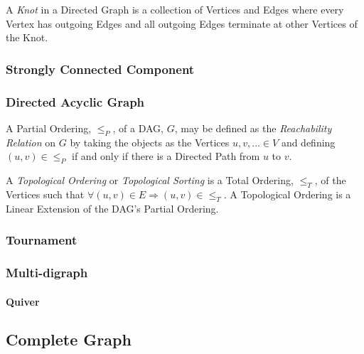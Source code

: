 A \emph{Knot} in a Directed Graph is a collection of Vertices and
Edges where every Vertex has outgoing Edges and all outgoing Edges
terminate at other Vertices of the Knot.



\subsubsection{Strongly Connected Component}
\label{sec:strongly_connected}

\subsubsection{Directed Acyclic Graph} \label{sec:dag}

A Partial Ordering, $\leq_P$, of a DAG, $G$, may be defined as the
\emph{Reachability Relation} on $G$ by taking the objects as the
Vertices $u,v,... \in V$ and defining $(u,v) \in \leq_P$ if and only
if there is a Directed Path from $u$ to $v$.

A \emph{Topological Ordering} or \emph{Topological Sorting} is a Total
Ordering, $\leq_T$, of the Vertices such that $\forall (u,v) \in E
\Rightarrow (u,v) \in \leq_T$. A Topological Ordering is a Linear
Extension of the DAG's Partial Ordering. %



\subsubsection{Tournament}\label{sec:tournament}



\subsubsection{Multi-digraph}\label{sec:multi-digraph}

\paragraph{Quiver}\label{sec:quiver}



\subsection{Complete Graph} \label{sec:complete_graph}


